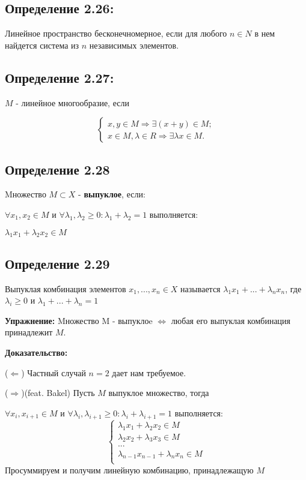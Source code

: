 \documentclass[12pt]{article}
\begin{document}
	
\subsection*{Определение 2.26:}
	Линейное пространство бесконечномерное, если для любого $n \in N$  в нем найдется система из $n$ независимых элементов.
	
\subsection*{Определение 2.27:}
 	$M$ - линейное многообразие, если 	
	
$$
\begin{cases}
   x,y \in M \Rightarrow \exists (x+y) \in M; \\
   x \in M , \lambda \in R \Rightarrow \exists \lambda x \in M.
\end{cases}
$$

\subsection*{Определение 2.28}
	Mножество $M \subset X$ - \textbf{выпуклое}, если:
	
	$\forall x_1, x_2 \in M$ и $\forall \lambda_1 , \lambda_2 \ge 0 : \lambda_1 + \lambda_2 = 1$ выполняется:
	
	$\lambda_1 x_1 + \lambda_2 x_2 \in M$
	
\subsection*{Определение 2.29}
	Выпуклая комбинация элементов $x_1, ..., x_n \in X$ называется $\lambda_1 x_1 + ... + \lambda_n x_n$, где 
	$\lambda_i \ge 0$ и $\lambda_1  + ...+  \lambda_n = 1$






\textbf{Упражнение:}
	Mножество M - выпуклоe $\Leftrightarrow$ любая его выпуклая комбинация принадлежит $M$.
	
\textbf{Доказательство:}
	
	($\Leftarrow$) Частный случай $n = 2$ дает нам требуемое.
	
	($\Rightarrow$)(feat. Bakel) Пусть $M$ выпуклое множество, тогда
	
	$\forall x_i, x_{i+1}\in M$ и $\forall \lambda_i , \lambda_{i+1} \ge 0 : \lambda_i + \lambda_{i+1} = 1$ выполняется:	
$$
\begin{cases}
  	\lambda_1 x_1 + \lambda_2 x_2 \in M \\
    \lambda_2 x_2 + \lambda_3 x_3 \in M \\ 
    ... \\
    \lambda_{n-1} x_{n-1} + \lambda_n x_n \in M \\ 
\end{cases}
$$	
Просуммируем и получим линейную комбинацию, принадлежащую $M$
	
\end{document}
